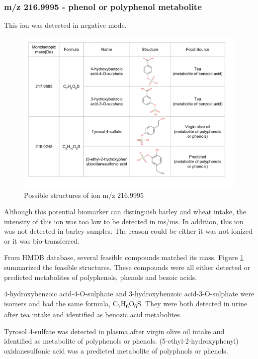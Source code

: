 \subsubsection{m/z 216.9995 - phenol or polyphenol metabolite}
This ion was detected in negative mode. 
\begin{figure}[h!]
    \centering
    \includegraphics[scale=0.46]{images/216d9995.pdf}
    \caption{Possible structures of ion m/z 216.9995}
    \label{fig:216p9995}
\end{figure}
Although this potential biomarker can distinguish barley and wheat intake, the intensity of this ion was too low to be detected in \acrshort{ms/ms}. In addition, this ion was not detected in barley samples. The reason could be either it was not ionized or it was bio-transferred. 

From HMDB database\cite{hmdb}, several feasible compounds matched its mass. Figure \ref{fig:216p9995} summarized the feasible structures. These compounds were all either detected or predicted metabolites of polyphenols, phenols and bezoic acids.

4-hydroxybenzoic acid-4-O-sulphate and 3-hydroxybenzoic acid-3-O-sulphate were isomers and had the same formula, C\textsubscript{7}H\textsubscript{6}O\textsubscript{6}S. They were both detected in urine after tea intake and identified as benozic acid metabolites\cite{tea}.

Tyrosol 4-sulfate was detected in plasma after virgin olive oil intake and identified as metabolite of polyphenols or phenols\cite{oliveoil}. (5-ethyl-2-hydroxyphenyl) oxidanesulfonic acid was a predicted metabolite of polyphnols or phenols\cite{polyphenolphd}.

